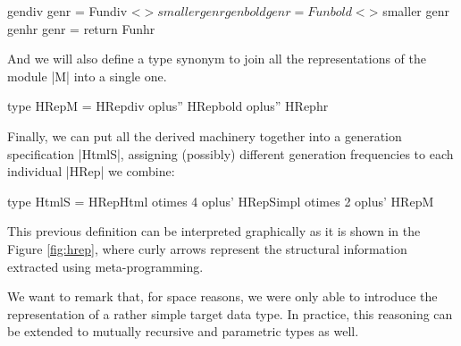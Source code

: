 \begin{code}
  gendiv   genr  = Fundiv <$> smaller genr
  genbold  genr  = Funbold <$> smaller genr
  genhr    genr  = return Funhr
\end{code} %

And we will also define a type synonym to join all the representations of the
module |M| into a single one.

\begin{code}
type HRepM  = HRepdiv oplus''  HRepbold oplus''  HRephr
\end{code}

Finally, we can put all the derived machinery together into a generation
specification |HtmlS|, assigning (possibly) different generation frequencies to
each individual |HRep| we combine:

\begin{code}
type HtmlS  =       HRepHtml   otimes 4
            oplus'  HRepSimpl  otimes 2
            oplus'  HRepM
\end{code}

This previous definition can be interpreted graphically as it is shown in the
Figure \ref{fig:hrep}, where curly arrows represent the structural information
extracted using meta-programming.

\begin{figure*}[t]
  \centering
  
  \caption{Higher-level representation of the data type |Html|, defined using
    structural information from the function |simpl| and the abstract interface
    of the module |M|.}
  \label{fig:hrep}
\end{figure*}

%   


We want to remark that, for space reasons, we were only able to introduce the
representation of a rather simple target data type.
%
In practice, this reasoning can be extended to mutually recursive and parametric
types as well.


